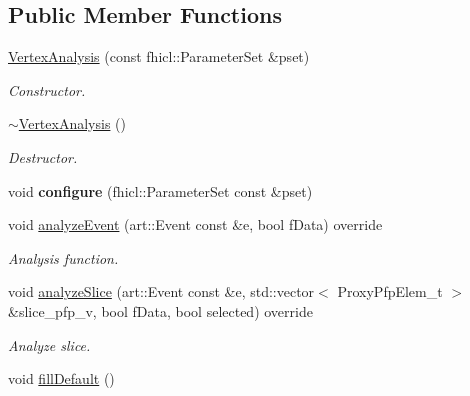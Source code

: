 \subsection*{Public Member Functions}
\begin{DoxyCompactItemize}
\item 
\hyperlink{classanalysis_1_1VertexAnalysis_adec367621161d1fb8c3722c54cc24452}{Vertex\+Analysis} (const fhicl\+::\+Parameter\+Set \&pset)
\begin{DoxyCompactList}\small\item\em Constructor. \end{DoxyCompactList}\item 
\hyperlink{classanalysis_1_1VertexAnalysis_a51614fa76833ac450a25cc59d57b602e}{$\sim$\+Vertex\+Analysis} ()\hypertarget{classanalysis_1_1VertexAnalysis_a51614fa76833ac450a25cc59d57b602e}{}\label{classanalysis_1_1VertexAnalysis_a51614fa76833ac450a25cc59d57b602e}

\begin{DoxyCompactList}\small\item\em Destructor. \end{DoxyCompactList}\item 
void {\bfseries configure} (fhicl\+::\+Parameter\+Set const \&pset)\hypertarget{classanalysis_1_1VertexAnalysis_a4dbe1d0f18392c838558d5365defb0d5}{}\label{classanalysis_1_1VertexAnalysis_a4dbe1d0f18392c838558d5365defb0d5}

\item 
void \hyperlink{classanalysis_1_1VertexAnalysis_ae5786ee30fa27f1e353d2f4be8d87303}{analyze\+Event} (art\+::\+Event const \&e, bool f\+Data) override\hypertarget{classanalysis_1_1VertexAnalysis_ae5786ee30fa27f1e353d2f4be8d87303}{}\label{classanalysis_1_1VertexAnalysis_ae5786ee30fa27f1e353d2f4be8d87303}

\begin{DoxyCompactList}\small\item\em Analysis function. \end{DoxyCompactList}\item 
void \hyperlink{classanalysis_1_1VertexAnalysis_a92a04f287cdc090fb83431f02882cb20}{analyze\+Slice} (art\+::\+Event const \&e, std\+::vector$<$ Proxy\+Pfp\+Elem\+\_\+t $>$ \&slice\+\_\+pfp\+\_\+v, bool f\+Data, bool selected) override\hypertarget{classanalysis_1_1VertexAnalysis_a92a04f287cdc090fb83431f02882cb20}{}\label{classanalysis_1_1VertexAnalysis_a92a04f287cdc090fb83431f02882cb20}

\begin{DoxyCompactList}\small\item\em Analyze slice. \end{DoxyCompactList}\item 
void \hyperlink{classanalysis_1_1VertexAnalysis_a783ba09d780bff0f2bb0b9721571503a}{fill\+Default} ()\hypertarget{classanalysis_1_1VertexAnalysis_a783ba09d780bff0f2bb0b9721571503a}{}\label{classanalysis_1_1VertexAnalysis_a783ba09d780bff0f2bb0b9721571503a}


\end{DoxyCompactItemize}

